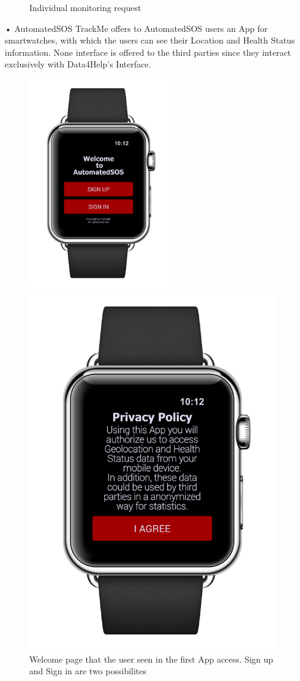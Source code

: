 \begin{enumerate}
\begin{figure}
\caption{Individual monitoring request}
\end{figure}
\newpage
\item[•]{\Large AutomatedSOS}
\bigbreak
\noindent
TrackMe offers to AutomatedSOS users an App for smartwatches, with which the users can see their Location and Health Status information. None interface is offered to the third parties since they interact exclusively with Data4Help's Interface. 
\begin{figure}[H]
\begin{center}
        \begin{minipage}[c]{.40\textwidth}
        \centering
          \includegraphics[height=9cm]{Images/Mockups/AutomatedSOSMockup1.png}
	\caption{Welcome page that the user seen in the first App access. Sign up and Sign in are two possibilites }
        \end{minipage}%
        \hspace{10mm}%
        \begin{minipage}[c]{.40\textwidth}
        \centering
          \includegraphics[height=9 cm]{Images/Mockups/AutomatedSOSMockup2.png}

\end{minipage}
\end{center}
\end{figure}
\end{enumerate}
